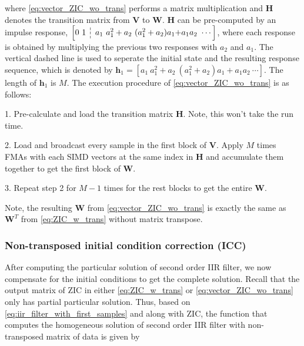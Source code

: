 where \eqref{eq:vector_ZIC_wo_trans} performs a matrix multiplication and $\bm{H}$ denotes
the transition matrix from $\bm{V}$ to $\bm{W}$. $\bm{H}$ can be pre-computed
by an impulse response, $\left[0 ~ 1~ \dashline ~ a_1 ~ a_1^2+a_2 ~ (a_1^2+a_2)a_1{+}a_1a_2~\cdots\right]$,
where each response is obtained by multiplying the previous two responses with $a_2$ and $a_1$.
The vertical dashed line is used to seperate the initial state and the resulting response sequence,
which is denoted by $\bm{h}_1 = \left[a_1 ~ a_1^2+a_2 ~ (a_1^2+a_2)a_1{+}a_1a_2~\cdots\right]$.
The length of $\bm{h}_1$ is $M$.
The execution procedure of \eqref{eq:vector_ZIC_wo_trans} is as follows:

1. Pre-calculate and load the transition matrix $\bm{H}$. Note, this won't take the run time.

2. Load and broadcast every sample in the first block of $\bm{V}$. Apply $M$ times FMAs with each SIMD vectors at the same index in $\bm{H}$
and accumulate them together to get the first block of $\bm{W}$.

3. Repeat step 2 for $M{-}1$ times for the rest blocks to get the entire $\bm{W}$.

Note, the resulting $\bm{W}$ from \eqref{eq:vector_ZIC_wo_trans} is exactly the same as 
$\bm{W}^T$ from \eqref{eq:ZIC_w_trans} without matrix transpose.

\subsubsection{Non-transposed initial condition correction (ICC)}

After computing the particular solution of second order IIR filter, we now compensate for the 
initial conditions to get the complete solution. Recall that the output matrix of ZIC in either \eqref{eq:ZIC_w_trans} or
\eqref{eq:vector_ZIC_wo_trans} only has partial particular solution. Thus, based on \eqref{eq:iir_filter_with_first_samples} and along with ZIC,
the function that computes the homogeneous solution of second order
IIR filter with non-transposed matrix of data is given by 

